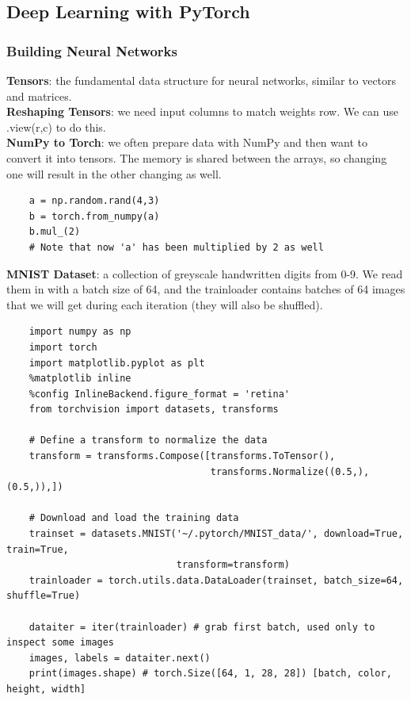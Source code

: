 \documentclass[11pt, a4paper]{article}
\begin{document}
\begin{spacing}{1.1}
	\subsection{Deep Learning with PyTorch}
	\subsubsection{Building Neural Networks}
	\textbf{Tensors}: the fundamental data structure for neural networks, similar to vectors and matrices.\vspace*{2mm}\\
	\textbf{Reshaping Tensors}: we need input columns to match weights row. We can use .view(r,c) to do this.\vspace*{2mm}\\
	\textbf{NumPy to Torch}: we often prepare data with NumPy and then want to convert it into tensors. The memory is shared between the arrays, so changing one will result in the other changing as well.
	\begin{lstlisting}
	a = np.random.rand(4,3)
	b = torch.from_numpy(a)
	b.mul_(2)
	# Note that now 'a' has been multiplied by 2 as well
	\end{lstlisting} \vspace*{2mm}
	\textbf{MNIST Dataset}: a collection of greyscale handwritten digits from 0-9. We read them in with a batch size of 64, and the trainloader contains batches of 64 images that we will get during each iteration (they will also be shuffled). 
	\begin{lstlisting}
	import numpy as np
	import torch
	import matplotlib.pyplot as plt
	%matplotlib inline
	%config InlineBackend.figure_format = 'retina'
	from torchvision import datasets, transforms
	
	# Define a transform to normalize the data
	transform = transforms.Compose([transforms.ToTensor(), 
	                                transforms.Normalize((0.5,), (0.5,)),])
	
	# Download and load the training data
	trainset = datasets.MNIST('~/.pytorch/MNIST_data/', download=True, train=True, 
	                          transform=transform)
	trainloader = torch.utils.data.DataLoader(trainset, batch_size=64, shuffle=True)
	
	dataiter = iter(trainloader) # grab first batch, used only to inspect some images
	images, labels = dataiter.next()
	print(images.shape) # torch.Size([64, 1, 28, 28]) [batch, color, height, width]
	\end{lstlisting} \newpage


\end{spacing}
\end{document}
